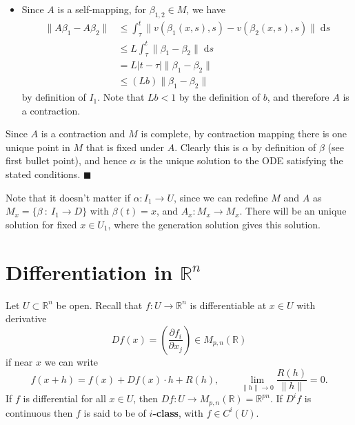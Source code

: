 \documentclass[letter-paper]{tufte-book}
\newenvironment{proof}[1][Proof]{\begin{trivlist}
\item[\hskip \labelsep {\bfseries #1}]}{\end{trivlist}}
\newcommand{\qed}{\hfill$\blacksquare$}
\begin{document}
\begin{proof}
\begin{itemize}
    \item Since $A$ is a self-mapping, for $\beta_{1,2} \in M$, we have
    \begin{align*}
      \|A\beta_1 - A\beta_2\| &\leq \int_\tau^t \|v(\beta_1(x, s), s) - v(\beta_2(x, s), s) \|\; \mathrm{d}s \\
        &\leq L \int_\tau^t \|\beta_1 - \beta_2\|\; \mathrm{d}s\\
        &= L |t - \tau| \|\beta_1 - \beta_2\|\\
        &\leq (Lb) \|\beta_1 - \beta_2\|
    \end{align*}
    by definition of $I_1$. Note that $Lb < 1$ by the definition of
    $b$, and therefore $A$ is a contraction.
  \end{itemize}
  Since $A$ is a contraction and $M$ is complete, by contraction mapping there
  is one unique point in $M$ that is fixed under $A$. Clearly this is $\alpha$
  by definition of $\beta$ (see first bullet point), and hence $\alpha$ is the
  unique solution to the ODE satisfying the stated conditions. \qed
\end{proof}

Note that it doesn't matter if $\alpha : I_1 \to U$, since we can redefine $M$
and $A$ as $M_{x} = \{\beta\ :\ I_1 \to D\}$ with $\beta(t) = x$, and $A_{x} :
M_{x} \to M_{x}$. There will be an unique solution for fixed $x \in U_1$, where
the generation solution gives this solution.


\section{Differentiation in $\mathbb{R}^n$}

Let $U \subset \mathbb{R}^n$ be open. Recall that $f : U \to \mathbb{R}^n$ is differentiable at $x \in U$ with derivative
\begin{equation}
  Df(x) = \left(\frac{\partial f_i}{\partial x_j}\right) \in M_{p,n}(\mathbb{R})
\end{equation}
if near $x$ we can write
\begin{equation*}
  f(x + h) = f(x) + Df(x) \cdot h + R(h), \qquad \lim_{\|h\|\to 0} \frac{R(h)}{\|h\|} = 0.
\end{equation*}
If $f$ is differential for all $x \in U$, then $Df : U \to M_{p, n}(\mathbb{R})
= \mathbb{R}^{pn}$. If $D^i f$ is continuous then $f$ is said to be of
\textbf{$i$-class}, with $f \in C^i (U)$.
\end{document}
